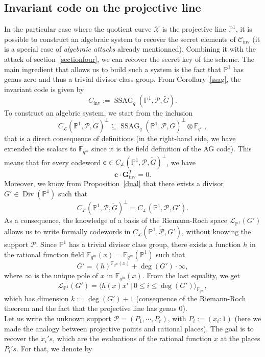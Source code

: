 \documentclass[10pt]{article}
\theoremstyle{definition}
\theoremstyle{definition}
\theoremstyle{definition}
\newcommand{\cd}{\cdot}
\newcommand{\C}{\mathcal{C}}
\newcommand{\PP}{\mathbb{P}}
\newcommand{\Fqm}{\mathbb{F}_{q^m}}
\newcommand{\su}{\subseteq}
\newcommand{\X}{\mathcal{X}}
\newcommand{\PR}{\mathcal{P}}
\newcommand{\Div}{\operatorname{Div}}
\newcommand{\ssag}{\operatorname{SSAG}}
\newcommand{\calL}{\mathcal{L}}
\begin{document}
\subsection{Invariant code on the projective line} \label{section6.1}


In the particular case where the quotient curve $\X$ is the projective line $\PP^1$, it is possible to construct an algebraic system to recover the secret elements of $\C_{\mathrm{inv}}$ (it is a special case of \textit{algebraic attacks} already mentionned). Combining it with the attack of section~\ref{sectionfour}, we can  recover the secret key of the scheme. The main ingredient that allows us to build such a system is the fact that $\PP^1$ has genus zero and thus a trivial divisor class group. 
From Corollary~\ref{ssag}, the invariant code is given by 
\[C_{\mathrm{inv}} := \ssag_q(\PP^1,\PR,\tilde{G}).\]
To construct an algebric system, we start from the inclusion 
\[C_{\calL}(\PP^1,\PR,\tilde{G})^{\perp} \su \ssag_q(\PP^1,\PR,\tilde{G})^{\perp} \otimes \Fqm,\]
that is a direct consequence of definitions (in the right-hand side, we have extended the scalars to $\Fqm$ since it is the field definition of the AG code). This means that for every codeword $\mathbf{c} \in C_{\calL}(\PP^1,\PR,\tilde{G})^{\perp}$, we have 
\begin{equation} \label{eq12}
\mathbf{c} \cd \mathbf{G}_{\mathrm{inv}}^T = 0.
\end{equation} 
Moreover, we know from Proposition~\ref{dual} that there exists a divisor $G' \in \Div(\PP^1)$ such that
\[ C_{\calL}(\PP^1,\PR,\tilde{G})^{\perp} = C_{\calL}(\PP^1,\PR,G').\]
As a consequence, the knowledge of a basis of the Riemann-Roch space $\calL_{\mathbb{P}^1}(G')$ allows us to write formally codewords in $C_{\calL}(\PP^1,\tilde{\PR},G')$, without knowing the support $\PR$. Since $\PP^1$ has a trivial divisor class group, there exists a function $h$ in the rational function field $\Fqm(x) = \Fqm(\PP^1)$ such that
\[ G' = (h)^{\Fqm(x)} + \deg(G') \cd \infty,\]
where $\infty$ is the unique pole of $x$ in $\Fqm(x)$. From the last equality, we get
\[\calL_{\mathbb{P}^1}(G') = \langle h(x)x^i \ | \ 0 \leq i \leq \deg(G')\rangle_{\Fqm},\]
which has dimension $k:=\deg(G')+1$ (consequence of the Riemann-Roch theorem and the fact that the projective line has genus $0$). \\
Let us write the unknown support $\PR = (P_1,\cdots,P_r)$, with $P_i := (x_i:1)$ (here we made the analogy between projective points and rational places). The goal is to recover the $x_i's$, which are the evaluations of the rational function $x$ at the places $P_i's$. For that, we denote by  
\end{document}
